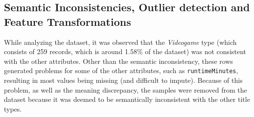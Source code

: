 \subsection{Semantic Inconsistencies, Outlier detection and Feature Transformations}
While analyzing the dataset, it was observed that the \textit{Videogame} type (which consists of 259
records, which is around 1.58\% of the dataset) was not consistent with the other attributes. Other than the semantic inconsistency, these rows
generated problems for some of the other attributes, such as \texttt{runtimeMinutes}, resulting in most
values being missing (and difficult to impute). Because of this problem, as well as the meaning discrepancy, the samples  were removed from the dataset because it was deemed to be semantically inconsistent with the other title types.\\




